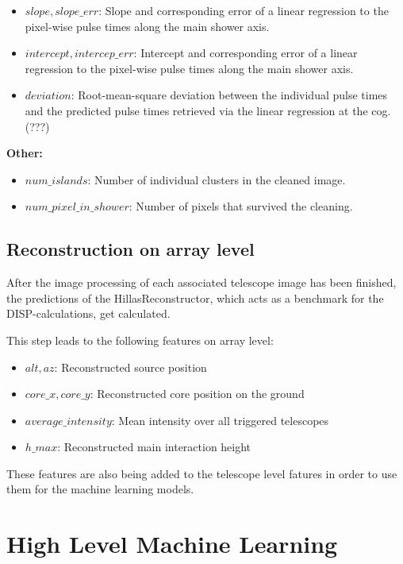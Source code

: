 \begin{itemize}
    \item{$slope, slope\_err$: Slope and corresponding  error of a linear regression to the pixel-wise pulse times along the main shower axis.}
    \item{$intercept, intercep\_err$: Intercept and corresponding  error of a linear regression to the pixel-wise pulse times along the main shower axis.}
    \item{$deviation$: Root-mean-square deviation between the individual pulse times and the predicted pulse times
        retrieved via the linear regression at the cog. (???)}
\end{itemize}

\textbf{Other:}

\begin{itemize}
    \item{$num\_islands$: Number of individual clusters in the cleaned image.}
    \item{$num\_pixel\_in\_shower$: Number of pixels that survived the cleaning.}
\end{itemize}

\subsection{Reconstruction on array level}  %
After the image processing of each associated telescope image has been finished,
the predictions of the
HillasReconstructor, which acts as a benchmark for the DISP-calculations, get calculated.

This step leads to the following features on array level:
\begin{itemize}
    \item{$alt, az$: Reconstructed source position}
    \item{$core\_x, core\_y$: Reconstructed core position on the ground}
    \item{$average\_intensity$: Mean intensity over all triggered telescopes}
    \item{$h\_max$: Reconstructed main interaction height}
\end{itemize}

These features are also being added to the telescope level fatures in order to
use them for the machine learning models.

\section{High Level Machine Learning}

